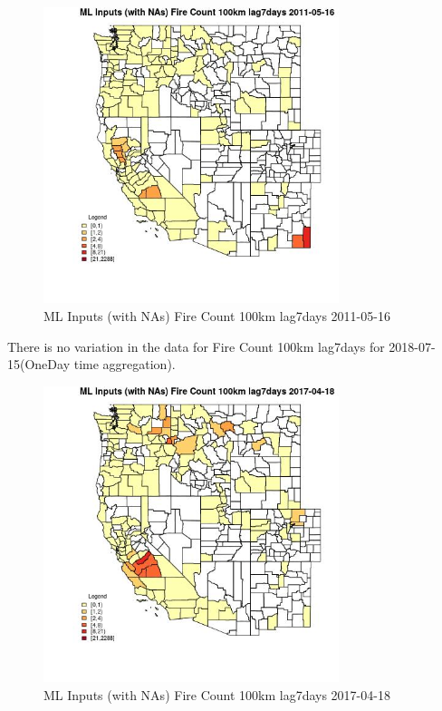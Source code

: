 \begin{figure} 
\centering  
\includegraphics[width=0.77\textwidth]{Code_Outputs/Report_ML_input_PM25_Step4_part_e_de_duplicated_aves_compiled_2019-05-21wNAs_CountyFire_Count_100km_lag7daysMean2011-05-16.jpg} 
\caption{\label{fig:Report_ML_input_PM25_Step4_part_e_de_duplicated_aves_compiled_2019-05-21wNAsCountyFire_Count_100km_lag7daysMean2011-05-16}ML Inputs (with NAs) Fire Count 100km lag7days 2011-05-16} 
\end{figure} 
 

There is no variation in the data for Fire Count 100km lag7days for 2018-07-15(OneDay time aggregation). 
 

\begin{figure} 
\centering  
\includegraphics[width=0.77\textwidth]{Code_Outputs/Report_ML_input_PM25_Step4_part_e_de_duplicated_aves_compiled_2019-05-21wNAs_CountyFire_Count_100km_lag7daysMean2017-04-18.jpg} 
\caption{\label{fig:Report_ML_input_PM25_Step4_part_e_de_duplicated_aves_compiled_2019-05-21wNAsCountyFire_Count_100km_lag7daysMean2017-04-18}ML Inputs (with NAs) Fire Count 100km lag7days 2017-04-18} 
\end{figure} 
 

